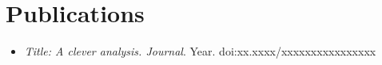 \documentclass[a4paper,20pt]{article}
\begin{document}


\newpage
\section{Publications}
\vspace{5pt}  
\begin{itemize} 
\item \textit{Title: A clever analysis. Journal}. Year. doi:xx.xxxx/xxxxxxxxxxxxxxxx
\end{itemize}

\end{document}
